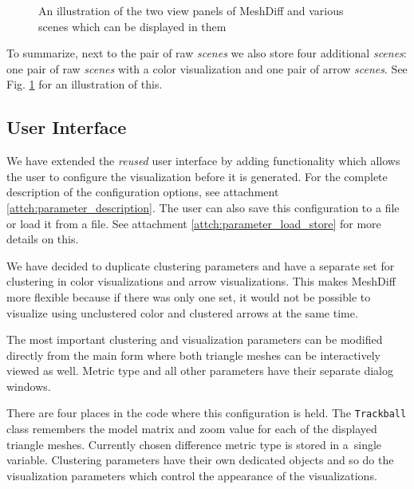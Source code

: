 \begin{figure}[h]
	\centering
	\def\svgwidth{\textwidth}
	
	\caption[Scenes explained]{An illustration of the two view panels of MeshDiff and various scenes which can be displayed in them}
	\label{fig:illustration-scenes_explained}
\end{figure}

To summarize, next to the pair of raw {\it scenes} we also store four additional {\it scenes}: one pair of raw {\it scenes} with a color visualization and one pair of arrow {\it scenes}. See Fig. \ref{fig:illustration-scenes_explained} for an illustration of this.

\subsection{User Interface}
\label{subsec:implementation-architecture-user_interface}

We have extended the {\it reused} user interface by adding functionality which allows the user to configure the visualization before it is generated. For the complete description of the configuration options, see attachment \ref{attch:parameter_description}. The user can also save this configuration to a file or load it from a file. See attachment \ref{attch:parameter_load_store} for more details on this.

We have decided to duplicate clustering parameters and have a separate set for clustering in color visualizations and arrow visualizations. This makes MeshDiff more flexible because if there was only one set, it would not be possible to visualize using unclustered color and clustered arrows at the same time.

The most important clustering and visualization parameters can be modified directly from the main form where both triangle meshes can be interactively viewed as well. Metric type and all other parameters have their separate dialog windows.

There are four places in the code where this configuration is held. The \verb+Trackball+ class remembers the model matrix and zoom value for each of the displayed triangle meshes. Currently chosen difference metric type is stored in a~single variable. Clustering parameters have their own dedicated objects and so do the visualization parameters which control the appearance of the visualizations.

